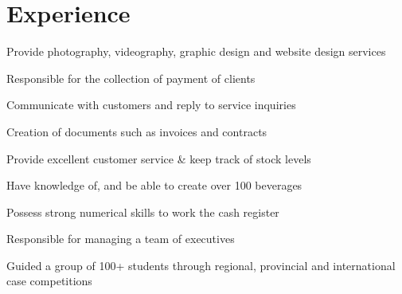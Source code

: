 \documentclass[]{deedy-resume-openfont}
\begin{document}


\section{Experience}
\begin{tightemize}
\item Provide photography, videography, graphic design and website design services 
\item Responsible for the collection of payment of clients 
\item Communicate with customers and reply to service inquiries 
\item Creation of documents such as invoices and contracts
\end{tightemize}
\sectionsep

\begin{tightemize}
\item Provide excellent customer service \& keep track of stock levels 
\item Have knowledge of, and be able to create over 100 beverages 
\item Possess strong numerical skills to work the cash register
\end{tightemize}
\sectionsep

\begin{tightemize}
\item Responsible for managing a team of executives 
\item Guided a group of 100+ students through regional, provincial and international case competitions 
\end{tightemize}
\sectionsep

\end{document}
